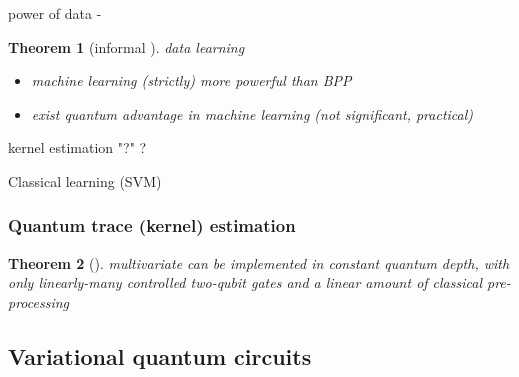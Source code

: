 \documentclass[
10pt,
aps,
pra,
linenumbers,
floatfix,
]{revtex4-2}
\theoremstyle{plain}
\newtheorem{theorem}{Theorem}
\theoremstyle{definition}
\newtheorem{definition}{Definition}
\begin{document}
power of data - 
\begin{theorem}[informal \cite{huangPowerDataQuantum2021}]
	data learning
	\begin{itemize}
		\item machine learning (strictly) more powerful than BPP
		\item exist quantum advantage in machine learning (not significant, practical)
	\end{itemize}
\end{theorem}
\begin{algorithm}[H]
    \DontPrintSemicolon
    \BlankLine
     {
        kernel estimation 
    {\Return "?"}
    }
    \Return ?
    \caption{Classical learning (SVM)}
    \label{alg:classical_learning}
\end{algorithm}

\subsubsection{Quantum trace (kernel) estimation}
\begin{theorem}[\cite{quekMultivariateTraceEstimation2022}]
	multivariate  can be implemented in constant quantum depth, with only linearly-many controlled two-qubit gates and a linear amount of classical pre-processing	
\end{theorem}

\subsection{Variational quantum circuits}
\end{document}
